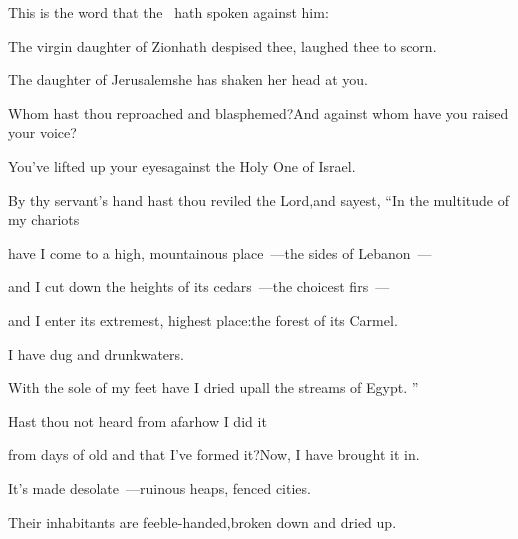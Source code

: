 
\begin{inparaenum}
   This is the word that the \lord\ hath spoken against him:\smallskip%

  \pa{}The virgin daughter of Zion\pa{}hath despised thee, laughed thee to scorn.%

  \pa{}The daughter of Jerusalem\pa{}she has shaken her head at you.%

  \pa{} Whom hast thou reproached and blasphemed?\pa{}And against whom have you raised your voice?%

  \pa{}You've lifted up your eyes\pa{}against the Holy One of Israel.%

  \pa{} By thy servant's hand hast thou reviled the Lord,\pa{}and sayest, ``In the multitude of my chariots%

  \pa{}have I come to a high, mountainous place~---\pa{}the sides of Lebanon~---%

  \pa{}and I cut down the heights of its cedars~---\pa{}the choicest firs~---%

  \pa{}and I enter its extremest, highest place:\pa{}the forest of its Carmel.%

  \pa{} I have dug and drunk\pa{}waters.%

  \pa{}With the sole of my feet have I dried up\pa{}all the streams of Egypt.%
  ''%

  \pb{} Hast thou not heard from afar\pa{}how I did it%

  \pa{}from days of old and that I've formed it?\pa{}Now, I have brought it in.%

  \pa{}It's made desolate~---\pa{}ruinous heaps, fenced cities.%

  \pa{} Their inhabitants are feeble-handed,\pa{}broken down and dried up.%


\end{inparaenum}
